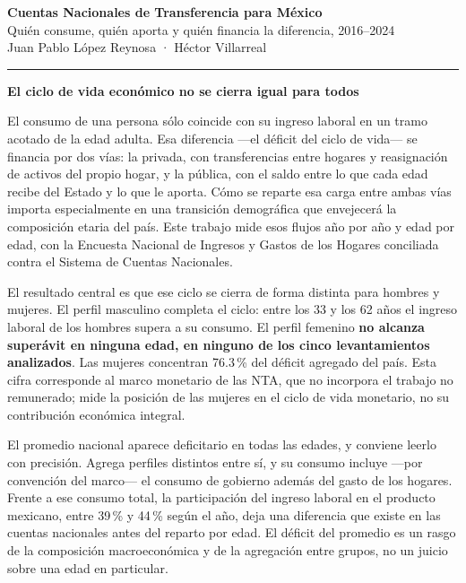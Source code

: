 \documentclass[11pt,a4paper]{article}
\newcommand{\titulillo}[1]{%
  \vspace{0.30em}\textcolor{acento}{\textbf{\large #1}}\par\vspace{0.08em}}
\begin{document}
\begin{center}
{\LARGE\bfseries Cuentas Nacionales de Transferencia para México}\\[0.35em]
{\large Quién consume, quién aporta y quién financia la diferencia, 2016--2024}\\[0.7em]
{\normalsize Juan Pablo López Reynosa \quad · \quad Héctor Villarreal}
\end{center}

\vspace{0.4em}
\hrule
\vspace{0.9em}

\titulillo{El ciclo de vida económico no se cierra igual para todos}

El consumo de una persona sólo coincide con su ingreso laboral en un tramo acotado de la edad
adulta. Esa diferencia ---el déficit del ciclo de vida--- se financia por dos vías: la privada,
con transferencias entre hogares y reasignación de activos del propio hogar, y la pública, con el
saldo entre lo que cada edad recibe del Estado y lo que le aporta. Cómo se reparte esa carga entre
ambas vías importa especialmente en una transición demográfica que envejecerá la composición
etaria del país. Este trabajo mide esos flujos año por año y edad por edad, con la Encuesta
Nacional de Ingresos y Gastos de los Hogares conciliada contra el Sistema de Cuentas Nacionales.

El resultado central es que ese ciclo se cierra de forma distinta para hombres y mujeres. El
perfil masculino completa el ciclo: entre los 33 y los 62 años el ingreso laboral de los hombres
supera a su consumo. El perfil femenino \textbf{no alcanza superávit en ninguna edad, en ninguno
de los cinco levantamientos analizados}. Las mujeres concentran 76.3\,\% del déficit agregado del
país. Esta cifra corresponde al marco monetario de las NTA, que no incorpora el trabajo
no remunerado; mide la posición de las mujeres en el ciclo de vida monetario, no su contribución
económica integral.

El promedio nacional aparece deficitario en todas las edades, y conviene leerlo con precisión.
Agrega perfiles distintos entre sí, y su consumo incluye ---por convención del marco--- el
consumo de gobierno además del gasto de los hogares. Frente a ese consumo total, la participación
del ingreso laboral en el producto mexicano, entre 39\,\% y 44\,\% según el año, deja una
diferencia que existe en las cuentas nacionales antes del reparto por edad. El déficit
del promedio es un rasgo de la composición macroeconómica y de la agregación entre grupos, no un
juicio sobre una edad en particular.
\end{document}

